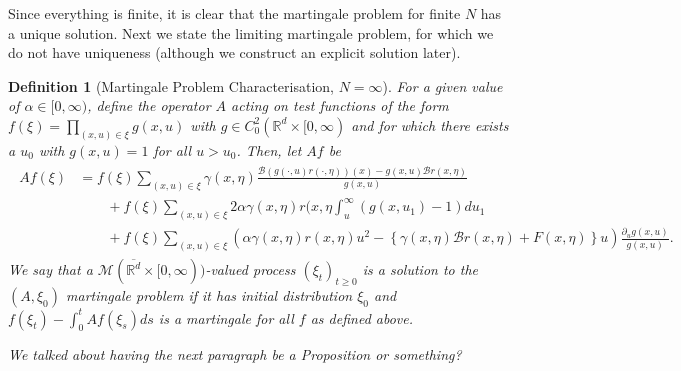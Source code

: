 \documentclass[12pt]{article}
\newtheorem{definition}[theorem]{Definition}
\newcommand{\IR}{\mathbb R}
\newcommand{\DG}{\mathcal{B}}  %
\newcommand{\lp}{\xi}              %
\newcommand{\lpmeasures}{\mathcal{M}(\overline{\IR^d} \times [0,\infty))} %
\newcommand{\comment}[1]{{\color{blue} \it #1}}
\begin{document}
Since everything is finite,
it is clear that the martingale problem for finite $N$ has a unique solution.
Next we state the limiting martingale problem,
for which we do not have uniqueness (although we construct an explicit solution later).

\begin{definition}[Martingale Problem Characterisation, $N=\infty$]
    \label{defn:limiting_lookdown_mgale}
    For a given value of $\alpha \in [0, \infty)$,
    define the operator $A$ acting on test functions of the form
    $f(\xi) = \prod_{(x, u) \in \xi} g(x, u)$ with $g \in C_0^2(\IR^d \times [0, \infty)$
    and for which there exists a $u_0$ with $g(x, u) = 1$ for all $u > u_0$.
    Then, let $A f$ be
    \begin{align} \begin{split} \label{eqn:limiting_lookdown_generator}
    A f(\lp)
    &=
        f(\lp)  \sum_{(x, u) \in \xi}
        \gamma(x, \eta)
            \frac{
                \DG(g(\cdot, u) r(\cdot, \eta))(x) - g(x,u) \DG r(x,\eta)
            }{
                g(x, u)
            }
    \\ &\qquad {} +
        f(\lp) \sum_{(x, u) \in \xi}
        2 \alpha \gamma(x, \eta) r(x, \eta \int_u^\infty (g(x, u_1) - 1) du_1
    \\ &\qquad {} +
        f(\lp) \sum_{(x, u) \in \xi}
        \left(
            \alpha \gamma(x, \eta) r(x, \eta) u^2
            -
            \left\{
                \gamma(x, \eta) \DG r(x, \eta) + F(x, \eta)
            \right\} u
        \right)
        \frac{\partial_u g(x, u)}{ g(x,u) }  .
    \end{split} \end{align}
    We say that a $\lpmeasures$-valued process $(\xi_t)_{t \ge 0}$
    is a solution to the $(A, \lp_0)$ martingale problem
    if it has initial distribution $\lp_0$
    and $f(\lp_t) - \int_0^t Af(\lp_s) ds$ is a martingale for all $f$
    as defined above.
\end{definition}

\comment{We talked about having the next paragraph be a Proposition or something?}
\end{document}
